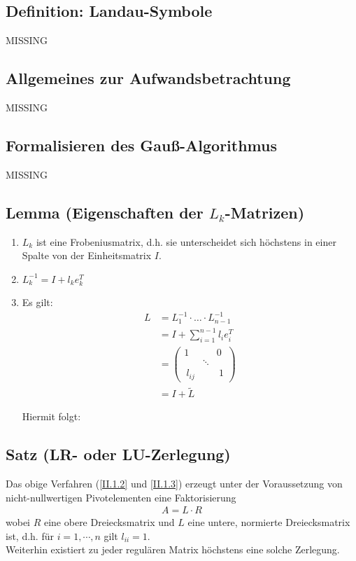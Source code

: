 \documentclass[ngerman,fontsize=11pt, paper=a4, parskip=half, titlepage=true, toc=bib]{scrbook}
\begin{document}
\subsection{Definition: Landau-Symbole} 
MISSING

\subsection{Allgemeines zur Aufwandsbetrachtung}
MISSING

\subsection{Formalisieren des Gauß-Algorithmus}  


MISSING

\subsection{Lemma (Eigenschaften der $L_k$-Matrizen)} \label{2.1.12} 
\begin{enumerate}[1.]
	\item $L_k$ ist eine Frobeniusmatrix, d.h. sie unterscheidet sich höchstens
			 in einer Spalte von der Einheitsmatrix $I$.
	\item $L_k^{-1} = I + l_ke_{k}^T$
	\item Es gilt:
			\begin{align}
				L &= L_1^{-1} \cdot \dotsc \cdot L_{n-1}^{-1}  
				\label{II.1.13}
				\\ \nonumber
					& = I + \sum_{i=1}^{n-1} l_i e_i^T \\ \nonumber
					&= \begin{pmatrix}
						1 && 0 ~ \\
						&\ddots& \\
						~l_{ij} && ~1
					\end{pmatrix} \\ \nonumber
					&= I+ \widetilde{L}
			\end{align}
			
			Hiermit folgt: 
\end{enumerate}

\subsection{Satz (LR- oder LU-Zerlegung)} 
Das obige Verfahren (\eqref{II.1.2} und \eqref{II.1.3}) erzeugt unter der Voraussetzung
von nicht-nullwertigen Pivotelementen eine Faktorisierung
\begin{align*}
	A= L\cdot R 
\end{align*}
wobei $R$ eine obere Dreiecksmatrix und $L$ eine untere, normierte Dreiecksmatrix ist,
d.h. für $i=1, \cdots , n$ gilt $l_{ii}= 1$. \\
Weiterhin existiert zu jeder regulären Matrix höchstens eine solche Zerlegung.
\end{document}
